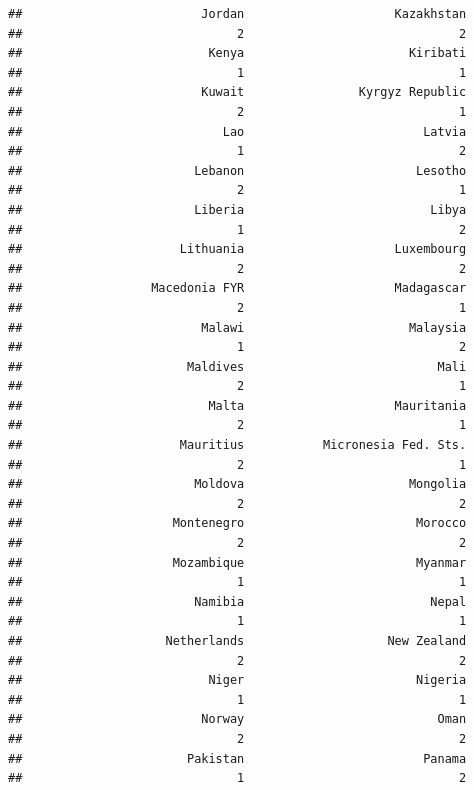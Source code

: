 \documentclass[
]{article}
\begin{document}
\begin{verbatim}
##                         Jordan                     Kazakhstan 
##                              2                              2 
##                          Kenya                       Kiribati 
##                              1                              1 
##                         Kuwait                Kyrgyz Republic 
##                              2                              1 
##                            Lao                         Latvia 
##                              1                              2 
##                        Lebanon                        Lesotho 
##                              2                              1 
##                        Liberia                          Libya 
##                              1                              2 
##                      Lithuania                     Luxembourg 
##                              2                              2 
##                  Macedonia FYR                     Madagascar 
##                              2                              1 
##                         Malawi                       Malaysia 
##                              1                              2 
##                       Maldives                           Mali 
##                              2                              1 
##                          Malta                     Mauritania 
##                              2                              1 
##                      Mauritius           Micronesia Fed. Sts. 
##                              2                              1 
##                        Moldova                       Mongolia 
##                              2                              2 
##                     Montenegro                        Morocco 
##                              2                              2 
##                     Mozambique                        Myanmar 
##                              1                              1 
##                        Namibia                          Nepal 
##                              1                              1 
##                    Netherlands                    New Zealand 
##                              2                              2 
##                          Niger                        Nigeria 
##                              1                              1 
##                         Norway                           Oman 
##                              2                              2 
##                       Pakistan                         Panama 
##                              1                              2 

\end{verbatim}
\end{document}
